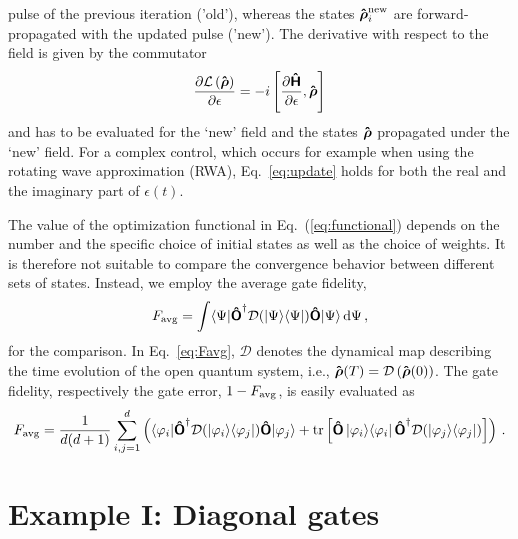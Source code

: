 pulse of the previous iteration ('old'), whereas the states
$\boldsymbol{\mathsf{\hat{\rho}}}^{\operatorname{new}}_i$ are forward-propagated with the updated 
pulse ('new'). The derivative with respect to the field is given by
the commutator
\begin{equation}
\frac{\partial \mathcal{L}\left(\boldsymbol{\mathsf{\hat{\rho}}}\right)}{\partial \epsilon}
= -i \left[\frac{\partial \boldsymbol{\mathsf{\hat{H}}}}{\partial \epsilon}, \boldsymbol{\mathsf{\hat{\rho}}} \right]
\end{equation}
and has to be evaluated for the `new' field and the states $\boldsymbol{\mathsf{\hat{\rho}}}$ propagated
under the `new' field. For a complex control, which
occurs for example when using the rotating wave approximation (RWA),
Eq.~\eqref{eq:update} holds for both the real and the imaginary part
of   $\epsilon(t)$. 

The value of the optimization functional in Eq.~(\ref{eq:functional}) depends on
the number and the specific choice of initial states as well as the choice of
weights. It is therefore not suitable to compare the convergence behavior
between different sets of states. Instead, we employ the average gate
fidelity, 
\begin{equation}
  F_{\operatorname{avg}} = \int \langle \Psi | \boldsymbol{\mathsf{\hat{O}}}^{\dagger}
              \mathcal{D}(\left\vert \Psi \right\rangle\!\left\langle \Psi \right\vert) 
             \boldsymbol{\mathsf{\hat{O}}} | \Psi \rangle \, \textnormal{d} \Psi\,,
  \label{eq:Favg}
\end{equation}
for the comparison. 
In Eq.~\eqref{eq:Favg}, $\mathcal D$ denotes the dynamical map
describing the time evolution of the open quantum system, i.e.,
$\boldsymbol{\mathsf{\hat{\rho}}}(T)=\mathcal D\left(\boldsymbol{\mathsf{\hat{\rho}}}(0)\right)$.
The gate fidelity, respectively the gate error, $1 - F_{\operatorname{avg}}$, is easily
evaluated as~\cite{PedersenPLA07} 
\begin{equation}
  F_{\operatorname{avg}} = \frac{1}{d (d+1)} \sum_{i,j=1}^d \left(
              \langle \varphi_i |
                \boldsymbol{\mathsf{\hat{O}}}^\dagger
                \mathcal{D}(\left\vert \varphi_i \right\rangle\!\left\langle \varphi_j \right\vert) 
                \boldsymbol{\mathsf{\hat{O}}} |
              \varphi_j \rangle
              + \operatorname{tr}\left[
                \boldsymbol{\mathsf{\hat{O}}}\left\vert \varphi_i \right\rangle\!\left\langle \varphi_i \right\vert\boldsymbol{\mathsf{\hat{O}}}^{\dagger}
                \mathcal{D}(\left\vert \varphi_j \right\rangle\!\left\langle \varphi_j \right\vert) 
              \right]
           \right)\,.
\end{equation}

\section{Example I: Diagonal gates}
\label{sec:phasegate}

